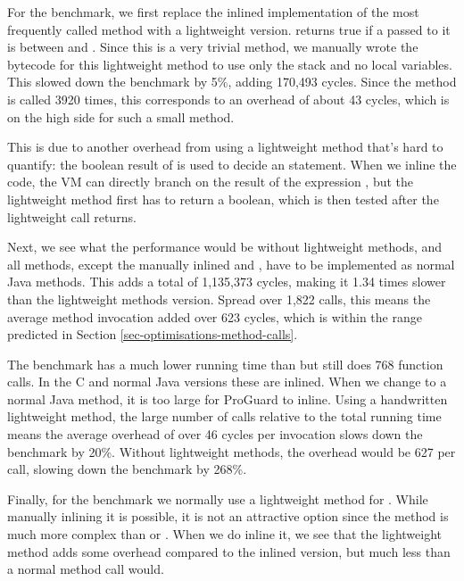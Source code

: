 For the  benchmark, we first replace the inlined implementation of the most frequently called method with a lightweight version.  returns true if a  passed to it is between  and . Since this is a very trivial method, we manually wrote the bytecode for this lightweight method to use only the stack and no local variables. This slowed down the benchmark by 5\%, adding 170,493 cycles. Since the method is called 3920 times, this corresponds to an overhead of about 43 cycles, which is on the high side for such a small method.

This is due to another overhead from using a lightweight method that's hard to quantify: the boolean result of  is used to decide an  statement. When we inline the code, the VM can directly branch on the result of the expression , but the lightweight method first has to return a boolean, which is then tested after the lightweight call returns.

Next, we see what the performance would be without lightweight methods, and all methods, except the manually inlined  and , have to be implemented as normal Java methods. This adds a total of 1,135,373 cycles, making it 1.34 times slower than the lightweight methods version. Spread over 1,822 calls, this means the average method invocation added over 623 cycles, which is within the range predicted in Section \ref{sec-optimisations-method-calls}.

The  benchmark has a much lower running time than  but still does 768 function calls. In the C and normal Java versions these are inlined. When we change  to a normal Java method, it is too large for ProGuard to inline. Using a handwritten lightweight method, the large number of calls relative to the total running time means the average overhead of over 46 cycles per invocation slows down the benchmark by 20\%. Without lightweight methods, the overhead would be 627 per call, slowing down the benchmark by 268\%.

Finally, for the  benchmark we normally use a lightweight method for . While manually inlining it is possible, it is not an attractive option since the  method is much more complex than  or . When we do inline it, we see that the lightweight method adds some overhead compared to the inlined version, but much less than a normal method call would.

